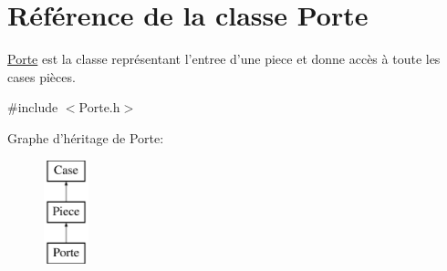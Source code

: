\hypertarget{classPorte}{\section{\-Référence de la classe \-Porte}
\label{classPorte}
}


\hyperlink{classPorte}{\-Porte} est la classe représentant l'entree d'une piece et donne accès à toute les cases pièces.  




{\ttfamily \#include $<$\-Porte.\-h$>$}

\-Graphe d'héritage de \-Porte\-:\begin{figure}[H]
\begin{center}
\leavevmode
\includegraphics[height=3.000000cm]{classPorte}
\end{center}
\end{figure}
